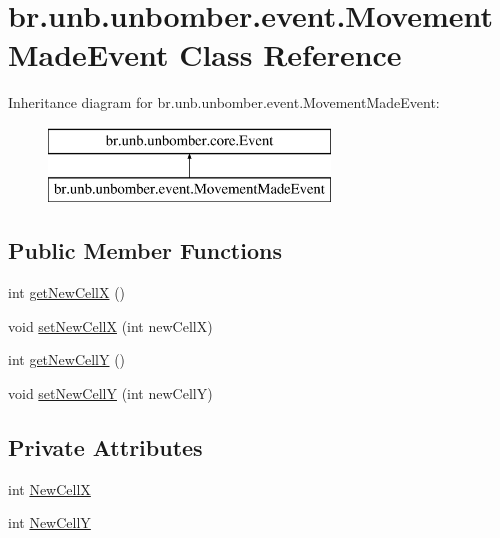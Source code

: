 \hypertarget{classbr_1_1unb_1_1unbomber_1_1event_1_1_movement_made_event}{\section{br.\+unb.\+unbomber.\+event.\+Movement\+Made\+Event Class Reference}
\label{classbr_1_1unb_1_1unbomber_1_1event_1_1_movement_made_event}
}
Inheritance diagram for br.\+unb.\+unbomber.\+event.\+Movement\+Made\+Event\+:\begin{figure}[H]
\begin{center}
\leavevmode
\includegraphics[height=2.000000cm]{classbr_1_1unb_1_1unbomber_1_1event_1_1_movement_made_event}
\end{center}
\end{figure}
\subsection*{Public Member Functions}
\begin{DoxyCompactItemize}
\item 
int \hyperlink{classbr_1_1unb_1_1unbomber_1_1event_1_1_movement_made_event_ae0c7363fc9b1603578fb4e5d2bfa17cf}{get\+New\+Cell\+X} ()
\item 
void \hyperlink{classbr_1_1unb_1_1unbomber_1_1event_1_1_movement_made_event_a024717c78a2b7b55feadf98df44181c9}{set\+New\+Cell\+X} (int new\+Cell\+X)
\item 
int \hyperlink{classbr_1_1unb_1_1unbomber_1_1event_1_1_movement_made_event_a6856c35f5cb5aad377f8367a72930eda}{get\+New\+Cell\+Y} ()
\item 
void \hyperlink{classbr_1_1unb_1_1unbomber_1_1event_1_1_movement_made_event_a263fcc5839445c3a69cd01906121addd}{set\+New\+Cell\+Y} (int new\+Cell\+Y)
\end{DoxyCompactItemize}
\subsection*{Private Attributes}
\begin{DoxyCompactItemize}
\item 
int \hyperlink{classbr_1_1unb_1_1unbomber_1_1event_1_1_movement_made_event_a21a582bfd76701ac3247a6687153b8f7}{New\+Cell\+X}
\item 
int \hyperlink{classbr_1_1unb_1_1unbomber_1_1event_1_1_movement_made_event_a073df13ffe5518f4b5cfc48b46c2c03b}{New\+Cell\+Y}
\end{DoxyCompactItemize}


